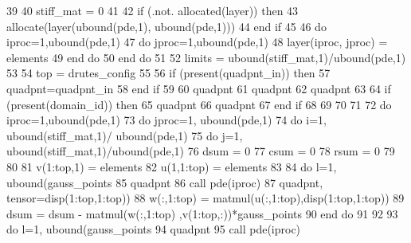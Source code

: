 \begin{DoxyCode}
39 
40       stiff_mat = 0
41 
42       \textcolor{keywordflow}{if} (.not. \textcolor{keyword}{allocated}(layer)) \textcolor{keywordflow}{then}
43         \textcolor{keyword}{allocate}(layer(ubound(pde,1), ubound(pde,1)))
44 \textcolor{keywordflow}{      end if}
45 
46       \textcolor{keywordflow}{do} iproc=1,ubound(pde,1)
47         \textcolor{keywordflow}{do} jproc=1,ubound(pde,1)
48             layer(iproc, jproc) = elements%
49 \textcolor{keywordflow}{        end do}
50 \textcolor{keywordflow}{      end do}
51       
52       limits = ubound(stiff_mat,1)/ubound(pde,1)
53 
54       top = drutes_config%
55       
56       \textcolor{keywordflow}{if} (\textcolor{keyword}{present}(quadpnt\_in)) \textcolor{keywordflow}{then}
57         quadpnt=quadpnt\_in
58 \textcolor{keywordflow}{      end if}
59 
60       quadpnt%
61       quadpnt%
62       quadpnt%
63       
64       \textcolor{keywordflow}{if} (\textcolor{keyword}{present}(domain\_id)) \textcolor{keywordflow}{then}
65         quadpnt%
66         quadpnt%
67 \textcolor{keywordflow}{      end if}
68       
69 
70      
71             
72       \textcolor{keywordflow}{do} iproc=1,ubound(pde,1)
73         \textcolor{keywordflow}{do} jproc=1, ubound(pde,1)
74           \textcolor{keywordflow}{do} i=1, ubound(stiff_mat,1)/ ubound(pde,1)
75             \textcolor{keywordflow}{do} j=1, ubound(stiff_mat,1)/ubound(pde,1)
76               dsum = 0
77               csum = 0
78               rsum = 0
79               
80               
81               v(1:top,1) = elements%
82               u(1,1:top) = elements%
83 
84               \textcolor{keywordflow}{do} l=1, ubound(gauss_points%
85                 quadpnt%
86                 \textcolor{keyword}{call }pde(iproc)%
87 \textcolor{comment}{                quadpnt, tensor=disp(1:top,1:top))}
88 \textcolor{comment}{                w(:,1:top) =  matmul(u(:,1:top),disp(1:top,1:top))}
89 \textcolor{comment}{                dsum = dsum - matmul(w(:,1:top) ,v(1:top,:))*gauss_points%
90 \textcolor{comment}{}\textcolor{keywordflow}{              end do}
91 
92   
93               \textcolor{keywordflow}{do} l=1, ubound(gauss_points%
94                 quadpnt%
95                 \textcolor{keyword}{call }pde(iproc)%
}
\end{DoxyCode}
